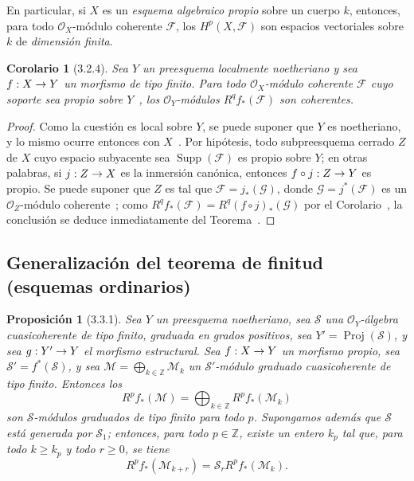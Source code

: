 \documentclass[10pt,oneside,openany]{book}
\theoremstyle{egaenv}\newtheorem*{env}{---}
\theoremstyle{egastatement}
\newtheorem*{proposition}{Proposición}
\newtheorem*{corollary}{Corolario}
\theoremstyle{egadescription}
\newcommand{\oldpage}[2][]{\marginnote{\normalfont\scriptsize\textbf{#1}\,|\,#2}\ignorespaces}
\renewcommand{\geq}{\geqslant}
\renewcommand{\to}{\mathchoice{\longrightarrow}{\rightarrow}{\rightarrow}{\rightarrow}}
\begin{document}
En particular, si $X$ es un \emph{esquema algebraico propio} sobre un cuerpo $k$, entonces, para todo $\mathcal O_X$-módulo coherente $\mathcal F$, los $H^p(X,\mathcal F)$ son espacios vectoriales sobre $k$ de \emph{dimensión finita}.

\begin{corollary}[3.2.4]
\label{III.3.2.4}
\label{III.3.2.4-fr}
Sea $Y$ un preesquema localmente noetheriano y sea $f:X\to Y$ un morfismo de tipo finito.
Para todo $\mathcal O_X$-módulo coherente $\mathcal F$ cuyo soporte sea propio sobre $Y$~, los $\mathcal O_Y$-módulos $R^qf_*(\mathcal F)$ son coherentes.
\end{corollary}

\oldpage[III]{118}
\begin{proof}
Como la cuestión es local sobre $Y$, se puede suponer que $Y$ es noetheriano, y lo mismo ocurre entonces con $X$~.
Por hipótesis, todo subpreesquema cerrado $Z$ de $X$ cuyo espacio subyacente sea $\operatorname{Supp}(\mathcal F)$ es propio sobre $Y$; en otras palabras, si $j:Z\to X$ es la inmersión canónica, entonces $f\circ j:Z\to Y$ es propio.
Se puede suponer que $Z$ es tal que $\mathcal F=j_*(\mathcal G)$, donde $\mathcal G=j^*(\mathcal F)$ es un $\mathcal O_Z$-módulo coherente~; como $R^qf_*(\mathcal F)=R^q(f\circ j)_*(\mathcal G)$ por el Corolario~, la conclusión se deduce inmediatamente del Teorema~.
\end{proof}

\subsection{Generalización del teorema de finitud (esquemas ordinarios)}
\label{subsection:III.3.3}
\label{subsection:III.3.3-fr}

\begin{proposition}[3.3.1]
\label{III.3.3.1}
\label{III.3.3.1-fr}
Sea $Y$ un preesquema noetheriano, sea $\mathcal S$ una $\mathcal O_Y$-álgebra cuasicoherente de tipo finito, graduada en grados positivos, sea $Y'=\operatorname{Proj}(\mathcal S)$, y sea $g:Y'\to Y$ el morfismo estructural.
Sea $f:X\to Y$ un morfismo propio, sea $\mathcal S'=f^*(\mathcal S)$, y sea $\mathcal M=\bigoplus_{k\in\mathbb Z}\mathcal M_k$ un $\mathcal S'$-módulo graduado cuasicoherente de tipo finito.
Entonces los \[
R^pf_*(\mathcal M)=\bigoplus_{k\in\mathbb Z}R^pf_*(\mathcal M_k)
\] son $\mathcal S$-módulos graduados de tipo finito para todo $p$.
Supongamos además que $\mathcal S$ está generada por $\mathcal S_1$; entonces, para todo $p\in\mathbb Z$, existe un entero $k_p$ tal que, para todo $k\geq k_p$ y todo $r\geq0$, se tiene
\[
R^pf_*(\mathcal M_{k+r})=\mathcal S_rR^pf_*(\mathcal M_k).
\tag{3.3.1.1}\label{III.3.3.1.1-fr}
\] 
\end{proposition}
\end{document}
